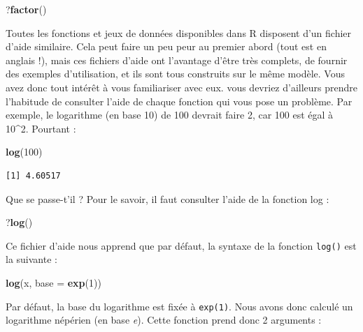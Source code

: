 \documentclass[a4paperpaper,]{article}
\newenvironment{Shaded}{\begin{snugshade}}{\end{snugshade}}
\newcommand{\KeywordTok}[1]{\textcolor[rgb]{0.13,0.29,0.53}{\textbf{#1}}}
\newcommand{\DataTypeTok}[1]{\textcolor[rgb]{0.13,0.29,0.53}{#1}}
\newcommand{\DecValTok}[1]{\textcolor[rgb]{0.00,0.00,0.81}{#1}}
\newcommand{\NormalTok}[1]{#1}
\theoremstyle{definition}
\theoremstyle{definition}
\theoremstyle{definition}
\theoremstyle{remark}
\begin{document}
\begin{Shaded}
\begin{Highlighting}[]
\NormalTok{?}\KeywordTok{factor}\NormalTok{()}
\end{Highlighting}
\end{Shaded}

Toutes les fonctions et jeux de données disponibles dans R disposent
d'un fichier d'aide similaire. Cela peut faire un peu peur au premier
abord (tout est en anglais !), mais ces fichiers d'aide ont l'avantage
d'être très complets, de fournir des exemples d'utilisation, et ils sont
tous construits sur le même modèle. Vous avez donc tout intérêt à vous
familiariser avec eux. vous devriez d'ailleurs prendre l'habitude de
consulter l'aide de chaque fonction qui vous pose un problème. Par
exemple, le logarithme (en base 10) de 100 devrait faire 2, car 100 est
égal à 10\^{}2. Pourtant :

\begin{Shaded}
\begin{Highlighting}[]
\KeywordTok{log}\NormalTok{(}\DecValTok{100}\NormalTok{)}
\end{Highlighting}
\end{Shaded}

\begin{verbatim}
[1] 4.60517
\end{verbatim}

Que se passe-t'il ? Pour le savoir, il faut consulter l'aide de la
fonction log :

\begin{Shaded}
\begin{Highlighting}[]
\NormalTok{?}\KeywordTok{log}\NormalTok{()}
\end{Highlighting}
\end{Shaded}

Ce fichier d'aide nous apprend que par défaut, la syntaxe de la fonction
\texttt{log()} est la suivante :

\begin{Shaded}
\begin{Highlighting}[]
\KeywordTok{log}\NormalTok{(x, }\DataTypeTok{base =} \KeywordTok{exp}\NormalTok{(}\DecValTok{1}\NormalTok{))}
\end{Highlighting}
\end{Shaded}

Par défaut, la base du logarithme est fixée à \texttt{exp(1)}. Nous
avons donc calculé un logarithme népérien (en base \emph{e}). Cette
fonction prend donc 2 arguments :
\end{document}
